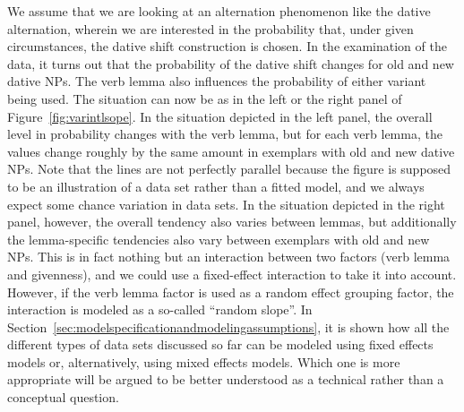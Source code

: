 We assume that we are looking at an alternation phenomenon like the dative alternation, wherein we are interested in the probability that, under given circumstances, the dative shift construction is chosen.
In the examination of the data, it turns out that the probability of the dative shift changes for old and new dative NPs.
The verb lemma also influences the probability of either variant being used.
The situation can now be as in the left or the right panel of Figure~\ref{fig:varintlsope}.
In the situation depicted in the left panel, the overall level in probability changes with the verb lemma, but for each verb lemma, the values change roughly by the same amount in exemplars with old and new dative NPs.
Note that the lines are not perfectly parallel because the figure is supposed to be an illustration of a data set rather than a fitted model, and we always expect some chance variation in data sets.
In the situation depicted in the right panel, however, the overall tendency also varies between lemmas, but additionally the lemma-specific tendencies also vary between exemplars with old and new NPs.
This is in fact nothing but an interaction between two factors (verb lemma and givenness), and we could use a fixed-effect interaction to take it into account.
However, if the verb lemma factor is used as a random effect grouping factor, the interaction is modeled as a so-called ``random slope''.
In Section~\ref{sec:modelspecificationandmodelingassumptions}, it is shown how all the different types of data sets discussed so far can be modeled using fixed effects models or, alternatively, using mixed effects models.
Which one is more appropriate will be argued to be better understood as a technical rather than a conceptual question.

